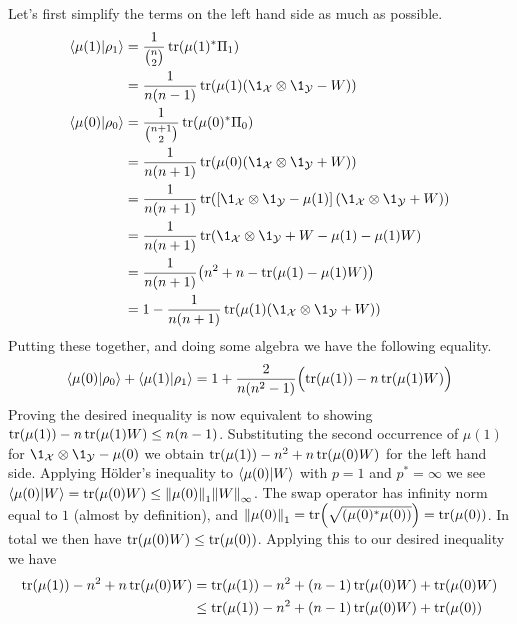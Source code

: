 \documentclass[boxes,pages,color=SeaGreen]{homework}
\newcommand{\X}{\mathcal{X}}
\newcommand{\Y}{\mathcal{Y}}
\begin{document}
\begin{solution}
  Let's first simplify the terms on the left hand side as much as possible.
  \begin{align*}
    \ip{\mu(1)}{\rho_1} & = \frac{1}{\binom{n}{2}}\tr(\mu(1)^*\Pi_1)                                     \\
                        & = \frac{1}{n(n-1)}\tr(\mu(1)(\1_\X\otimes\1_\Y - W))                           \\
    \ip{\mu(0)}{\rho_0} & = \frac{1}{\binom{n+1}{2}}\tr(\mu(0)^*\Pi_0)                                   \\
                        & = \frac{1}{n(n+1)}\tr(\mu(0)(\1_\X\otimes\1_\Y + W))                           \\
                        & = \frac{1}{n(n+1)}\tr(\qty[\1_\X\otimes\1_\Y - \mu(1)](\1_\X\otimes\1_\Y + W)) \\
                        & = \frac{1}{n(n+1)}\tr(\1_\X\otimes\1_\Y + W - \mu(1) - \mu(1)W)                \\
                        & = \frac{1}{n(n+1)}\qty(n^2 + n - \tr(\mu(1) - \mu(1)W))                        \\
                        & = 1 - \frac{1}{n(n+1)}\tr(\mu(1)(\1_\X\otimes\1_\Y + W))
  \end{align*}
  Putting these together, and doing some algebra we have the following equality.
  \begin{equation*}
    \ip{\mu(0)}{\rho_0} + \ip{\mu(1)}{\rho_1} = 1 + \frac{2}{n(n^2 - 1)}\qty\Big(\tr(\mu(1)) - n\tr(\mu(1)W))
  \end{equation*}
  Proving the desired inequality is now equivalent to showing $\tr(\mu(1)) - n\tr(\mu(1)W) \leq n(n - 1)$.
  Substituting the second occurrence of $\mu(1)$ for $\1_\X\otimes\1_\Y - \mu(0)$ we obtain $\tr(\mu(1)) - n^2 + n\tr(\mu(0)W)$ for the left hand side.
  Applying H\"older's inequality to $\ip{\mu(0)}{W}$ with $p = 1$ and $p^* = \infty$ we see $\ip{\mu(0)}{W} = \tr(\mu(0)W) \leq \norm{\mu(0)}_1\norm{W}_\infty$.
  The swap operator has infinity norm equal to $1$ (almost by definition), and $\norm{\mu(0)}_1 = \tr(\sqrt{(\mu(0)^*\mu(0))}) = \tr(\mu(0))$.
  In total we then have $\tr(\mu(0)W) \leq \tr(\mu(0))$.
  Applying this to our desired inequality we have
  \begin{align*}
    \tr(\mu(1)) - n^2 + n\tr(\mu(0)W) & = \tr(\mu(1)) - n^2 + (n-1)\tr(\mu(0)W) + \tr(\mu(0)W)   \\
                                      & \leq \tr(\mu(1)) - n^2 + (n-1)\tr(\mu(0)W) + \tr(\mu(0)) \\

\end{align*}
\end{solution}
\end{document}
